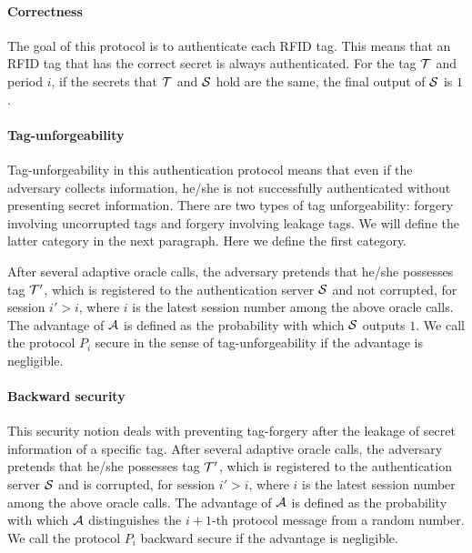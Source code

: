 \documentclass[english]{llncs}
\begin{document}
\paragraph{Correctness}

The goal of this protocol is to authenticate each RFID tag. This means
that an RFID tag that has the correct %
secret is always authenticated. For the tag ${\cal {T}}$ and period
$i$, if the %
secrets that ${\cal {T}}$ and ${\cal {S}}$ hold are the same, the
final output of ${\cal {S}}$ is $1$.


\paragraph{Tag-unforgeability}

Tag-unforgeability in this authentication protocol means that even
if the adversary collects information, he/she is not successfully
authenticated without presenting secret information. There are two
types of 
tag unforgeability: forgery involving uncorrupted tags and
forgery involving leakage tags. We will define the latter category
in the next paragraph. Here we define the first category.

After several adaptive oracle calls, the adversary pretends that he/she
possesses tag ${\cal {T'}}$, which is registered to the authentication
server ${\cal {S}}$ and not corrupted, for session $i'>i$, where
$i$ is the latest session number among the above oracle calls. The
advantage of ${\cal {A}}$ is defined as the probability with which
${\cal {S}}$ outputs $1$. We call the protocol $P_{i}$ secure in
the sense of tag-unforgeability if the advantage is negligible.


\paragraph{Backward security}

This security notion deals with preventing tag-forgery after the leakage
of secret information of a specific tag. After several adaptive oracle
calls, the adversary pretends that he/she possesses tag ${\cal {T'}}$,
which is registered to the authentication server ${\cal {S}}$ and
is corrupted, for session $i'>i$, where $i$ is the latest session
number among the above oracle calls. The advantage of ${\cal {A}}$
is defined as the probability with which ${\cal {A}}$ distinguishes
the $i+1$-th protocol message from a random number. We call the protocol
$P_{i}$ backward secure if the advantage is negligible.
\end{document}
